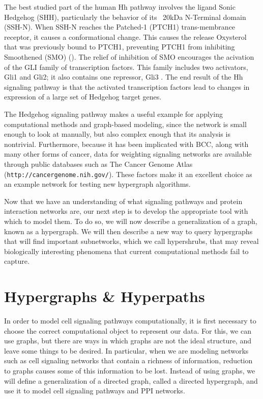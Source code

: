 \documentclass[12pt,twoside]{reedthesis}
\theoremstyle{definition}
\begin{document}
The best studied part of the human Hh pathway involves the ligand Sonic Hedgehog (SHH), particularly the behavior of its ~20kDa N-Terminal domain (SSH-N). When SSH-N reaches the Patched-1 (PTCH1) trans-membrance receptor, it causes a conformational change. This causes the release Oxysterol that was previously bound to PTCH1, preventing PTCH1 from inhibiting Smoothened (SMO) (\cite{Carpenter1998}). The relief of inhibition of SMO encourages the acivation of the GLI family of transcription factors. This family includes two activators, Gli1 and Gli2; it also contains one repressor, Gli3 \cite{Rahnama2006}. The end result of the Hh signaling pathway is that the activated transcription factors lead to changes in expression of a large set of Hedgehog target genes.

The Hedgehog signaling pathway makes a useful example for applying computational methods and graph-based modeling, since the network is small enough to look at manually, but also complex enough that its analysis is nontrivial. Furthermore, because it has been implicated with BCC, along with many other forms of cancer, data for weighting signaling networks are available through public databases such as The Cancer Genome Atlas (\texttt{http://cancergenome.nih.gov/}). These factors make it an excellent choice as an example network for testing new hypergraph algorithms.\par

Now that we have an understanding of what signaling pathways and protein interaction networks are, our next step is to develop the appropriate tool with which to model them. To do so, we will now describe a generalization of a graph, known as a hypergraph. We will then describe a new way to query hypergraphs that will find important subnetworks, which we call hypershrubs, that may reveal biologically interesting phenomena that current computational methods fail to capture.\par

\chapter{Hypergraphs \& Hyperpaths}

In order to model cell signaling pathways computationally, it is first necessary to choose the correct computational object to represent our data. For this, we can use graphs, but there are ways in which graphs are not the ideal structure, and leave some things to be desired. In particular, when we are modeling networks such as cell signaling networks that contain a richness of information, reduction to graphs causes some of this information to be lost. Instead of using graphs, we will define a generalization of a directed graph, called a directed hypergraph, and use it to model cell signaling pathways and PPI networks.\par
\end{document}
